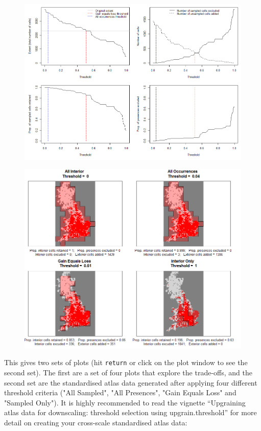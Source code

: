 \documentclass{article}[12pt, a4paper]
\begin{document}
\begin{figure}[!h]
\includegraphics[width=\linewidth]{Threshold_plots.png}
\end{figure}

\begin{figure}[!]
\includegraphics[width=\linewidth]{Threshold_maps.png}
\end{figure}

This gives two sets of plots (hit \texttt{return} or click on the plot window to see the second set). The first are a set of four plots that explore the trade-offs, and the second set are the standardised atlas data generated after applying four different threshold criteria ("All Sampled",  "All Presences",  "Gain Equals Loss" and "Sampled Only"). It is highly recommended to read the vignette “Upgraining atlas data for downscaling: threshold selection using upgrain.threshold” for more detail on creating your cross-scale standardised atlas data:
\end{document}
